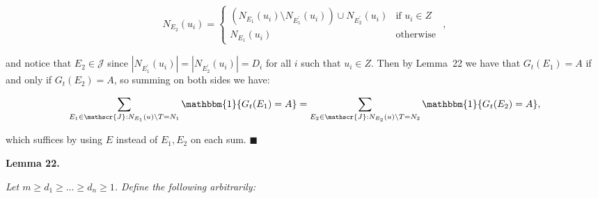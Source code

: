 \[\begin{gathered}
\displaystyle N_{E_{2}}(u_{i})=\begin{cases}\left(N_{E_{1}}(u_{i})\setminus N_{E^{\prime}_{1}}(u_{i})\right)\cup N_{E^{\prime}_{2}}(u_{i})&\text{if }u_{i}\in Z\\
N_{E_{1}}(u_{i})&\text{otherwise }\end{cases},
\end{gathered}\]


and notice that $E_{2}\in\mathscr{J}$ since $|N_{E^{\prime}_{1}}(u_{i})|=|N_{E^{\prime}_{2}}(u_{i})|=D_{i}$ for all $i$ such that $u_{i}\in Z$.
Then by Lemma 22 we have that $G_{t}(E_{1})=A$ if and only if $G_{t}(E_{2})=A$, so summing on both sides we have:\par


\[\begin{gathered}
\displaystyle\sum_{E_{1}\in\mathscr{J}:N_{E_{1}}(u)\setminus T=N_{1}}\mathbbm{1}\{G_{t}(E_{1})=A\}=\sum_{E_{2}\in\mathscr{J}:N_{E_{2}}(u)\setminus T=N_{2}}\mathbbm{1}\{G_{t}(E_{2})=A\},
\end{gathered}\]


which suffices by using $E$ instead of $E_{1},E_{2}$ on each sum.
\ensuremath{\blacksquare}\par






\par\medskip\noindent\textbf{\textbf{Lemma 22}\textbf{.}}\par



\emph{Let $m\geq d_{1}\geq\dots\geq d_{n}\geq 1$. Define the following arbitrarily:}\par


